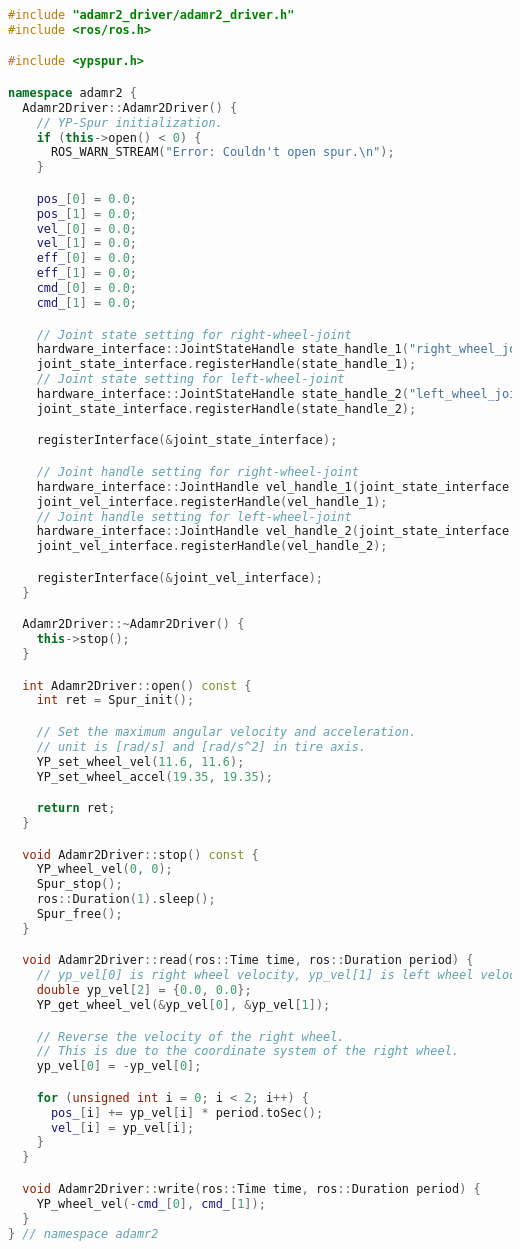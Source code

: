 \documentclass[{../../master}]{subfiles}
\begin{document}
\begin{lstlisting}[language=C++, label=code:adamr2_driver_cpp, caption=\textsf{adamr2\_driver.cpp}]
#include "adamr2_driver/adamr2_driver.h"
#include <ros/ros.h>

#include <ypspur.h>

namespace adamr2 {
  Adamr2Driver::Adamr2Driver() {
    // YP-Spur initialization.
    if (this->open() < 0) {
      ROS_WARN_STREAM("Error: Couldn't open spur.\n");
    }

    pos_[0] = 0.0;
    pos_[1] = 0.0;
    vel_[0] = 0.0;
    vel_[1] = 0.0;
    eff_[0] = 0.0;
    eff_[1] = 0.0;
    cmd_[0] = 0.0;
    cmd_[1] = 0.0;

    // Joint state setting for right-wheel-joint
    hardware_interface::JointStateHandle state_handle_1("right_wheel_joint", &pos_[0], &vel_[0], &eff_[0]);
    joint_state_interface.registerHandle(state_handle_1);
    // Joint state setting for left-wheel-joint
    hardware_interface::JointStateHandle state_handle_2("left_wheel_joint", &pos_[1], &vel_[0], &eff_[0]);
    joint_state_interface.registerHandle(state_handle_2);

    registerInterface(&joint_state_interface);

    // Joint handle setting for right-wheel-joint
    hardware_interface::JointHandle vel_handle_1(joint_state_interface.getHandle("right_wheel_joint"), &cmd_[0]);
    joint_vel_interface.registerHandle(vel_handle_1);
    // Joint handle setting for left-wheel-joint
    hardware_interface::JointHandle vel_handle_2(joint_state_interface.getHandle("left_wheel_joint"), &cmd_[1]);
    joint_vel_interface.registerHandle(vel_handle_2);

    registerInterface(&joint_vel_interface);
  }

  Adamr2Driver::~Adamr2Driver() {
    this->stop();
  }

  int Adamr2Driver::open() const {
    int ret = Spur_init();

    // Set the maximum angular velocity and acceleration.
    // unit is [rad/s] and [rad/s^2] in tire axis.
    YP_set_wheel_vel(11.6, 11.6);
    YP_set_wheel_accel(19.35, 19.35);

    return ret;
  }

  void Adamr2Driver::stop() const {
    YP_wheel_vel(0, 0);
    Spur_stop();
    ros::Duration(1).sleep();
    Spur_free();
  }

  void Adamr2Driver::read(ros::Time time, ros::Duration period) {
    // yp_vel[0] is right wheel velocity, yp_vel[1] is left wheel velocity.
    double yp_vel[2] = {0.0, 0.0};
    YP_get_wheel_vel(&yp_vel[0], &yp_vel[1]);

    // Reverse the velocity of the right wheel.
    // This is due to the coordinate system of the right wheel.
    yp_vel[0] = -yp_vel[0];

    for (unsigned int i = 0; i < 2; i++) {
      pos_[i] += yp_vel[i] * period.toSec();
      vel_[i] = yp_vel[i];
    }
  }

  void Adamr2Driver::write(ros::Time time, ros::Duration period) {
    YP_wheel_vel(-cmd_[0], cmd_[1]);
  }
} // namespace adamr2
\end{lstlisting}
\end{document}
